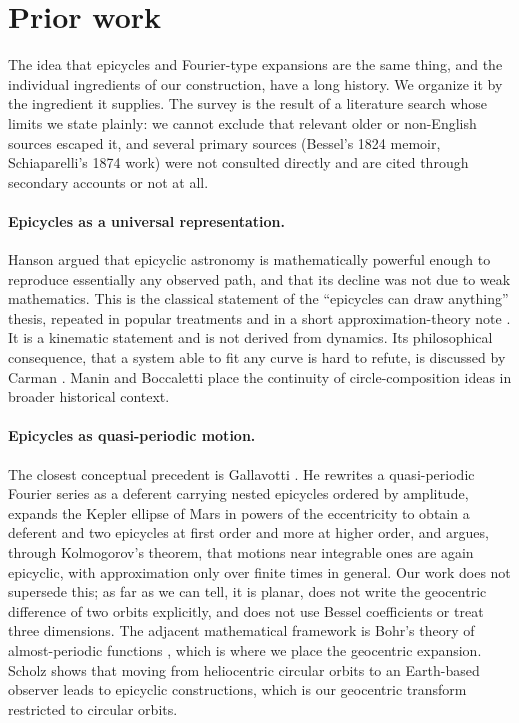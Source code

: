 \section{Prior work}
\label{sec:prior}

The idea that epicycles and Fourier-type expansions are the same thing, and
the individual ingredients of our construction, have a long history. We
organize it by the ingredient it supplies. The survey is the result of a
literature search whose limits we state plainly: we cannot exclude that
relevant older or non-English sources escaped it, and several primary sources
(Bessel's 1824 memoir, Schiaparelli's 1874 work) were not consulted directly
and are cited through secondary accounts or not at all.

\paragraph*{Epicycles as a universal representation.}
Hanson \cite{Hanson1960} argued that epicyclic astronomy is mathematically
powerful enough to reproduce essentially any observed path, and that its
decline was not due to weak mathematics. This is the classical statement of
the ``epicycles can draw anything'' thesis, repeated in popular treatments
\cite{Mathologer2018,3b1b2019,WikiDeferent} and in a short approximation-theory
note \cite{Acosta2019}. It is a kinematic statement and is not derived from
dynamics. Its philosophical consequence, that a system able to fit any
curve is hard to refute, is discussed by Carman \cite{Carman2010,Carman2015}.
Manin \cite{Manin2018} and Boccaletti \cite{Boccaletti2001} place the
continuity of circle-composition ideas in broader historical context.

\paragraph*{Epicycles as quasi-periodic motion.}
The closest conceptual precedent is Gallavotti \cite{Gallavotti2001}. He
rewrites a quasi-periodic Fourier series as a deferent carrying nested
epicycles ordered by amplitude, expands the Kepler ellipse of Mars in powers
of the eccentricity to obtain a deferent and two epicycles at first order and
more at higher order, and argues, through Kolmogorov's theorem, that motions
near integrable ones are again epicyclic, with approximation only over finite
times in general. Our work does not supersede this; as far as we can tell,
it is planar, does not write the geocentric difference of two orbits
explicitly, and does not use Bessel coefficients or treat three dimensions.
The adjacent mathematical framework is Bohr's theory of almost-periodic
functions \cite{Bohr1925}, which is where we place the geocentric
expansion. Scholz \cite{Scholz2022} shows that moving from heliocentric
circular orbits to an Earth-based observer leads to epicyclic constructions,
which is our geocentric transform restricted to circular orbits.


